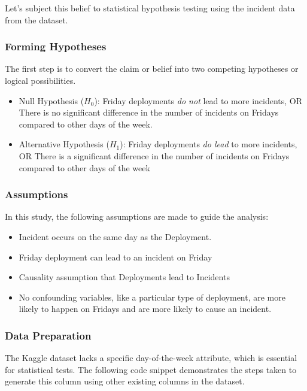 \documentclass{article}
\begin{document}
Let's subject this belief to statistical hypothesis testing using the incident data from the dataset.

\subsubsection{Forming Hypotheses}

The first step is to convert the claim or belief into two competing hypotheses or logical possibilities.

\begin{itemize}
    \item Null Hypothesis ($H_0$): Friday deployments \textit{do not} lead to more incidents, OR There is no significant difference in the number of incidents on Fridays compared to other days of the week.

    \item Alternative Hypothesis ($H_1$): Friday deployments \textit{do lead} to more incidents, OR There is a significant difference in the number of incidents on Fridays compared to other days of the week
\end{itemize}

\subsubsection{Assumptions}

In this study, the following assumptions are made to guide the analysis:

\begin{itemize}
    \item Incident occurs on the same day as the Deployment.
    \item Friday deployment can lead to an incident on Friday
    \item Causality assumption that Deployments lead to Incidents
    \item No confounding variables, like a particular type of deployment, are more likely to happen on Fridays and are more likely to cause an incident.    
\end{itemize}


\subsubsection{Data Preparation}


The Kaggle dataset lacks a specific day-of-the-week attribute, which is essential for statistical tests. The following code snippet demonstrates the steps taken to generate this column using other existing columns in the dataset.
\end{document}
